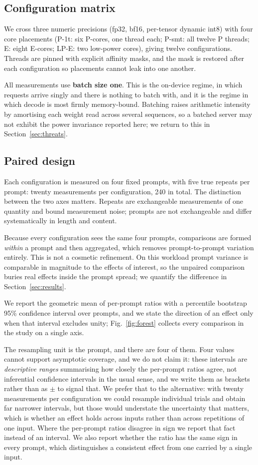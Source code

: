\documentclass[journal]{IEEEtran}
\begin{document}
\subsection{Configuration matrix}
We cross three numeric precisions (fp32, bf16, per-tensor dynamic int8) with
four core placements (P-1t: six P-cores, one thread each; P-smt: all twelve P
threads; E: eight E-cores; LP-E: two low-power cores), giving twelve
configurations. Threads are pinned with explicit affinity masks, and the mask
is restored after each configuration so placements cannot leak into one
another.

All measurements use \textbf{batch size one}. This is the on-device regime, in
which requests arrive singly and there is nothing to batch with, and it is the
regime in which decode is most firmly memory-bound. Batching raises arithmetic
intensity by amortising each weight read across several sequences, so a batched
server may not exhibit the power invariance reported here; we return to this in
Section~\ref{sec:threats}.

\subsection{Paired design}
\label{sec:stats}
Each configuration is measured on four fixed prompts, with five true repeats
per prompt: twenty measurements per configuration, 240 in total. The
distinction between the two axes matters. Repeats are exchangeable measurements
of one quantity and bound measurement noise; prompts are not exchangeable and
differ systematically in length and content.

Because every configuration sees the same four prompts, comparisons are formed
\emph{within} a prompt and then aggregated, which removes prompt-to-prompt
variation entirely. This is not a cosmetic refinement. On this workload prompt
variance is comparable in magnitude to the effects of interest, so the unpaired
comparison buries real effects inside the prompt spread; we quantify the
difference in Section~\ref{sec:results}.

We report the geometric mean of per-prompt ratios with a percentile bootstrap
95\% confidence interval over prompts, and we state the direction of an effect
only when that interval excludes unity; Fig.~\ref{fig:forest} collects every
comparison in the study on a single axis.

The resampling unit is the prompt, and there are four of them. Four values
cannot support asymptotic coverage, and we do not claim it: these intervals are
\emph{descriptive ranges} summarising how closely the per-prompt ratios agree,
not inferential confidence intervals in the usual sense, and we write them as
brackets rather than as $\pm$ to signal that. We prefer that to the alternative: with twenty
measurements per configuration we could resample individual trials and obtain
far narrower intervals, but those would understate the uncertainty that matters,
which is whether an effect holds across inputs rather than across repetitions of
one input. Where the per-prompt ratios disagree in sign we report that fact
instead of an interval. We also report whether the ratio has
the same sign in every prompt, which distinguishes a consistent effect from one
carried by a single input.
\end{document}
